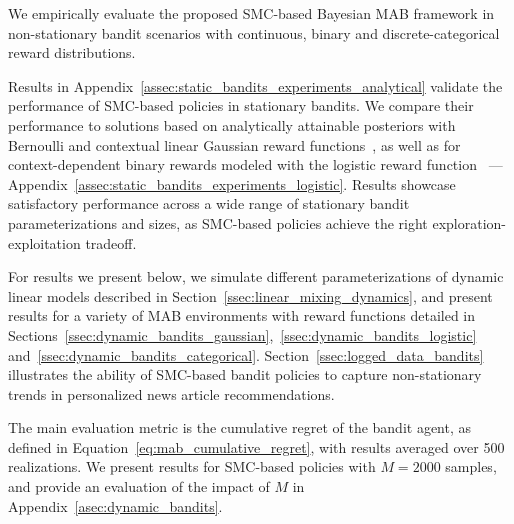 We empirically evaluate the proposed SMC-based Bayesian MAB framework
in non-stationary bandit scenarios
with continuous, binary and discrete-categorical reward distributions.

Results in Appendix~\ref{assec:static_bandits_experiments_analytical}
validate the performance of SMC-based policies in stationary bandits.
We compare their performance to solutions based on analytically attainable posteriors
with Bernoulli and contextual linear Gaussian reward functions~\citep{ip-Kaufmann2012,ip-Garivier2011a,ic-Korda2013,ip-Agrawal2013a},
as well as for context-dependent binary rewards modeled with the logistic reward function~\cite{ic-Chapelle2011,j-Scott2015} ---Appendix~\ref{assec:static_bandits_experiments_logistic}.
Results showcase satisfactory performance across a wide range of stationary bandit parameterizations and sizes,
as SMC-based policies achieve the right exploration-exploitation tradeoff.

For results we present below, we simulate different parameterizations of dynamic linear models described in Section~\ref{ssec:linear_mixing_dynamics},
and present results for a variety of MAB environments with reward functions detailed in Sections~\ref{ssec:dynamic_bandits_gaussian},~\ref{ssec:dynamic_bandits_logistic} and~\ref{ssec:dynamic_bandits_categorical}.
Section~\ref{ssec:logged_data_bandits} illustrates
the ability of SMC-based bandit policies
to capture non-stationary trends in personalized news article recommendations.

The main evaluation metric is the cumulative regret of the bandit agent, as defined in Equation~\eqref{eq:mab_cumulative_regret},
with results averaged over 500 realizations.
We present results for SMC-based policies with $M=2000$ samples,
and provide an evaluation of the impact of $M$ in Appendix~\ref{asec:dynamic_bandits}.


